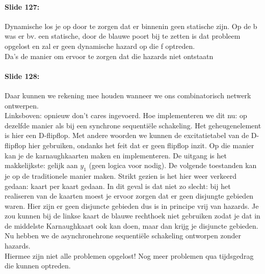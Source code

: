 \documentclass[10pt,a4paper]{book}
\begin{document}
\paragraph{Slide 127:} Dynamische los je op door te zorgen dat er binnenin geen statische zijn. Op de b was er bv. een statische, door de blauwe poort bij te zetten is dat probleem opgelost en zal er geen dynamische hazard op die f optreden.\\
Da's de manier om ervoor te zorgen dat die hazards niet ontstaatn

\paragraph{Slide 128:} Daar kunnen we rekening mee houden wanneer we ons combinatorisch netwerk ontwerpen.\\
Linksboven: opnieuw don't cares ingevoerd. Hoe implementeren we dit nu: op dezelfde manier als bij een synchrone sequenti\"ele schakeling. Het geheugenelement is hier een D-flipflop. Met andere woorden we kunnen de excitatietabel van de D-flipflop hier gebruiken, ondanks het feit dat er geen flipflop inzit. Op die manier kan je de karnaughkaarten maken en implementeren. De uitgang is het makkelijkste: gelijk aan $y_1$ (geen logica voor nodig). De volgende toestanden kan je op de traditionele manier maken. Strikt gezien is het hier weer verkeerd gedaan: kaart per kaart gedaan. In dit geval is dat niet zo slecht: bij het realiseren van de kaarten moest je ervoor zorgen dat er geen disjungte gebieden waren. Hier zijn er geen disjuncte gebieden dus is in principe vrij van hazards. Je zou kunnen bij de linkse kaart de blauwe rechthoek niet gebruiken zodat je dat in de middelste Karnaughkaart ook kan doen, maar dan krijg je disjuncte gebieden. Nu hebben we de asynchronehrone sequenti\"ele schakeling ontworpen zonder hazards.\\
Hiermee zijn niet alle problemen opgelost! Nog meer problemen qua tijdsgedrag die kunnen optreden.
\end{document}
